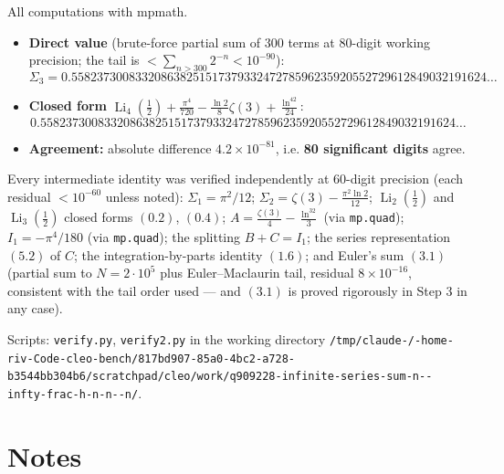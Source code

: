 \documentclass[11pt]{article}
\theoremstyle{remark}
\begin{document}
All computations with mpmath.

\begin{itemize}
\item \textbf{Direct value} (brute-force partial sum of $300$ terms at 80-digit working precision; the tail is $<\sum_{n>300}2^{-n}<10^{-90}$):
  $$\Sigma_3=0.55823730083320863825151737933247278596235920552729612849032191624\ldots$$
\item \textbf{Closed form} $\operatorname{Li}_4(\tfrac12)+\frac{\pi^4}{720}-\frac{\ln2}{8}\zeta(3)+\frac{\ln^42}{24}$:
  $$0.55823730083320863825151737933247278596235920552729612849032191624\ldots$$
\item \textbf{Agreement:} absolute difference $4.2\times10^{-81}$, i.e. \textbf{80 significant digits} agree.
\end{itemize}

Every intermediate identity was verified independently at 60-digit precision (each residual $<10^{-60}$ unless noted):
$\Sigma_1=\pi^2/12$; $\Sigma_2=\zeta(3)-\frac{\pi^2\ln2}{12}$; $\operatorname{Li}_2(\tfrac12)$ and $\operatorname{Li}_3(\tfrac12)$ closed forms $(0.2)$, $(0.4)$; $A=\frac{\zeta(3)}4-\frac{\ln^32}3$ (via \texttt{mp.quad}); $I_1=-\pi^4/180$ (via \texttt{mp.quad}); the splitting $B+C=I_1$; the series representation $(5.2)$ of $C$; the integration-by-parts identity $(1.6)$; and Euler's sum $(3.1)$ (partial sum to $N=2\cdot10^5$ plus Euler--Maclaurin tail, residual $8\times10^{-16}$, consistent with the tail order used --- and $(3.1)$ is proved rigorously in Step 3 in any case).

Scripts: \texttt{verify.py}, \texttt{verify2.py} in the working directory
\texttt{/\allowbreak tmp/\allowbreak claude-/\allowbreak -home-\allowbreak riv-\allowbreak Code-\allowbreak cleo-\allowbreak bench/\allowbreak 817bd907-\allowbreak 85a0-\allowbreak 4bc2-\allowbreak a728-\allowbreak b3544\allowbreak bb304\allowbreak b6/\allowbreak scratchpad/\allowbreak cleo/\allowbreak work/\allowbreak q909228-\allowbreak infinite-\allowbreak series-\allowbreak sum-\allowbreak n--\allowbreak infty-\allowbreak frac-\allowbreak h-\allowbreak n-\allowbreak n--\allowbreak n/}.

\section*{Notes}
\end{document}
